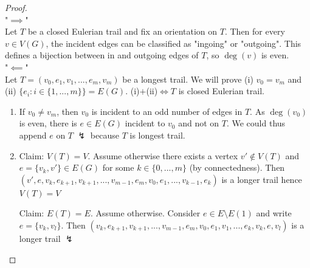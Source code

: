 \begin{proof}
\hfill \\
    "$\implies$" \\
    Let $T$ be a closed Eulerian trail and fix an orientation on $T$. Then for every $v\in V(G)$, the incident edges can be classified as "ingoing" or "outgoing". This defines a bijection between in and outgoing edges of $T$, so $\deg(v)$ is even.\\
    "$\impliedby$" \\
    Let $T=(v_0,e_1,v_1,...,e_m,v_m)$ be a longest trail. We will prove (i) $v_0=v_m$ and (ii) $\{e_i:i\in \{1,...,m\}\}=E(G)$. (i)$+$(ii)$\iff T$ is closed Eulerian trail.\\
    \begin{enumerate}
        \item If $v_0\neq v_m$, then $v_0$ is incident to an odd number of edges in $T$. As $\deg(v_0)$ is even, there is $e\in E(G)$ incident to $v_0$ and not on $T$. We could thus append $e$ on $T$ $\lightning$ because $T$ is longest trail.
        \item Claim: $V(T)=V$. Assume otherwise there exists a vertex $v'\notin V(T)$ and $e=\{v_k,v'\}\in E(G)$ for some $k\in \{0,...,m\}$ (by connectedness). Then $(v',e,v_k,e_{k+1},v_{k+1},...,v_{m-1},e_m,v_0,e_1,...,v_{k-1},e_k)$ is a longer trail hence $V(T)=V$
        \begin{center}
\end{center}
\par
        Claim: $E(T)=E$. Assume otherwise. Consider $e\in E\setminus E(1)$ and write $e=\{v_k,v_l\}$. Then $(v_k,e_{k+1},v_{k+1},...,v_{m-1},e_m,v_0,e_1,v_1,...,e_k,v_k,e,v_l)$ is a longer trail $\lightning$ 
    \end{enumerate}
\end{proof}
\vspace{0.5cm}


